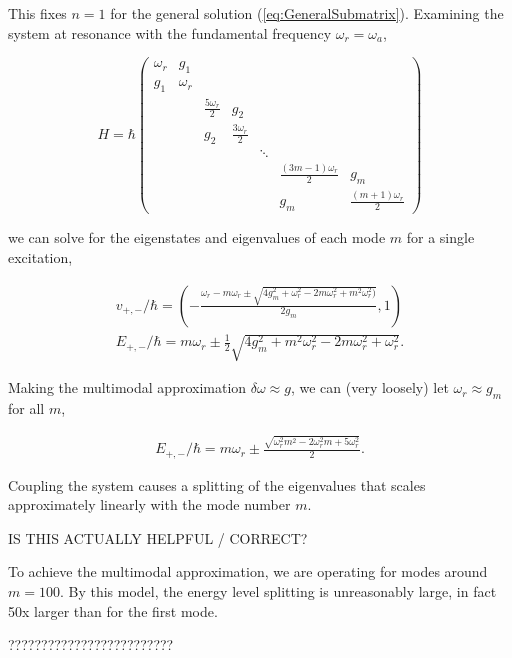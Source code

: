 \documentclass[11 pt, oneside]{book} %
\begin{document}
This fixes $n=1$ for the general solution (\ref{eq:GeneralSubmatrix}). Examining the system at resonance with the fundamental frequency $\omega_r=\omega_a$,


\begin{equation}\label{eq:MultimodalMatrix}
H =  \hbar\left(\begin{array}{cccccccc}
\omega_r 	& g_1 \\
 g_1   		& \omega_r \\
&&\frac{5\omega_r}{2} & g_2 \\
&&g_2		& \frac{3\omega_r}{2}\\
&&&&\ddots\\
&&&&&\frac{(3m-1)\omega_r}{2}	& g_m \\
&&&&& g_m				& \frac{(m+1)\omega_r}{2}
\end{array} \right)
\end{equation}

we can solve for the eigenstates and eigenvalues of each mode $m$ for a single excitation, 

\begin{eqnarray}
v_{+,-}/\hbar = (-\frac{\omega_r-m \omega_r \pm \sqrt{4 g_m^2+\omega_r^2-2 m \omega_r^2+m^2 \omega_r^2)}}{2g_m}, 1) \\
E_{+,-}/\hbar = m\omega_r \pm\frac{1}{2}\sqrt{4 g_m^2+m^2 \omega_r^2-2 m \omega_r^2+\omega_r^2}.
\end{eqnarray}

Making the multimodal approximation $\delta \omega \approx g$, we can (very loosely) let $\omega_r\approx g_m$ for all $m$,

\begin{eqnarray}
E_{+,-}/\hbar  =m\omega_r  \pm \frac{\sqrt{\omega_r^2 m^2 -2 \omega_r^2 m+5 \omega_r^2}}{2}.
\end{eqnarray}

Coupling the system causes a splitting of the eigenvalues that scales approximately linearly with the mode number $m$.

IS THIS ACTUALLY HELPFUL / CORRECT?

To achieve the multimodal approximation, we are operating for modes around $m=100$. By this model, the energy level splitting is unreasonably large, in fact 50x larger than for the first mode.

?????????????????????????

\end{document}
